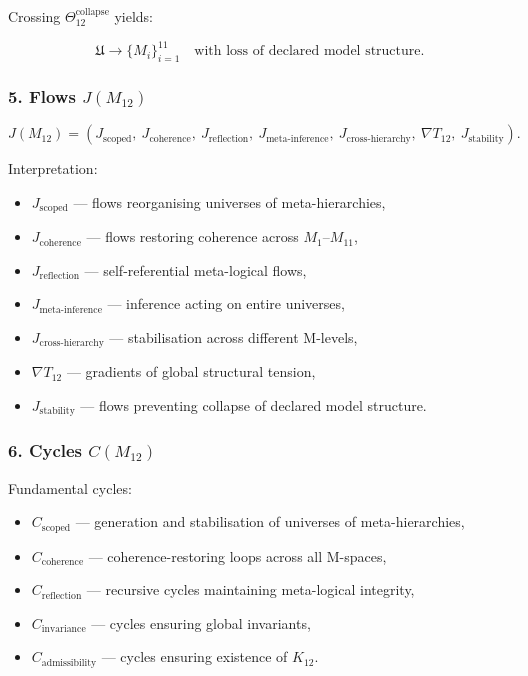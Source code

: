 Crossing $\Theta_{12}^{\mathrm{collapse}}$ yields:

\[
\mathfrak{U} \to \{ M_i \}_{i=1}^{11}
\quad\text{with loss of declared model structure}.
\]

\subsubsection*{5. Flows $J(M_{12})$}

\[
J(M_{12})=
(
J_{\mathrm{scoped}},\
J_{\mathrm{coherence}},\
J_{\mathrm{reflection}},\
J_{\mathrm{meta\mbox{-}inference}},\
J_{\mathrm{cross\mbox{-}hierarchy}},\
\nabla T_{12},\
J_{\mathrm{stability}}
).
\]

Interpretation:

\begin{itemize}
    \item $J_{\mathrm{scoped}}$ — flows reorganising universes of meta-hierarchies,
    \item $J_{\mathrm{coherence}}$ — flows restoring coherence across $M_1$–$M_{11}$,
    \item $J_{\mathrm{reflection}}$ — self-referential meta-logical flows,
    \item $J_{\mathrm{meta\mbox{-}inference}}$ — inference acting on entire universes,
    \item $J_{\mathrm{cross\mbox{-}hierarchy}}$ — stabilisation across different M-levels,
    \item $\nabla T_{12}$ — gradients of global structural tension,
    \item $J_{\mathrm{stability}}$ — flows preventing collapse of declared model structure.
\end{itemize}

\subsubsection*{6. Cycles $C(M_{12})$}

Fundamental cycles:

\begin{itemize}
    \item $C_{\mathrm{scoped}}$ — generation and stabilisation of universes of meta-hierarchies,
    \item $C_{\mathrm{coherence}}$ — coherence-restoring loops across all M-spaces,
    \item $C_{\mathrm{reflection}}$ — recursive cycles maintaining meta-logical integrity,
    \item $C_{\mathrm{invariance}}$ — cycles ensuring global invariants,
    \item $C_{\mathrm{admissibility}}$ — cycles ensuring existence of $K_{12}$.
\end{itemize}

